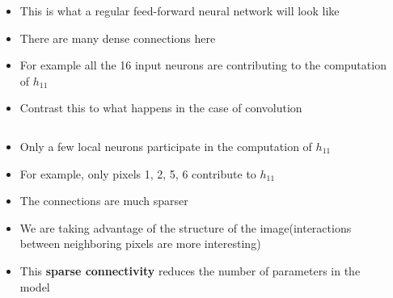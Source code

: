 
\begin{frame}
	\begin{columns}
		\begin{column}{0.5\textwidth}
			
		\end{column}
		\begin{column}{0.5\textwidth}
			
			\begin{itemize}
				\setlength\itemsep{1em}
				\item<10-> This is what a regular feed-forward neural network will look like
				\item<11-> There are many dense connections here
				\item<12-> For example all the 16 input neurons are contributing to the computation of $h_{11}$
				\item<13-> Contrast this to what happens in the case of convolution
			\end{itemize}
		\end{column}
	\end{columns}
\end{frame}


\begin{frame}
	\begin{columns}
		\begin{column}{0.5\textwidth}
			\begin{overprint}
				
			\end{overprint}
			       
		\end{column}
		\begin{column}{0.5\textwidth}
			\begin{itemize}
				\justifying
				\setlength\itemsep{1em}
				\item<2-> Only a few local neurons participate in the computation of $h_{11}$
				\item<3-> For example, only pixels 1, 2, 5, 6 contribute to $h_{11}$
				\item<7-> The connections are much sparser
				\item<8-> We are taking advantage of the structure of the image(interactions between neighboring pixels are more interesting)
				\item<9-> This \textbf{sparse connectivity} reduces the number of parameters in the model
			\end{itemize}
		\end{column}
		   
	\end{columns}
\end{frame}

